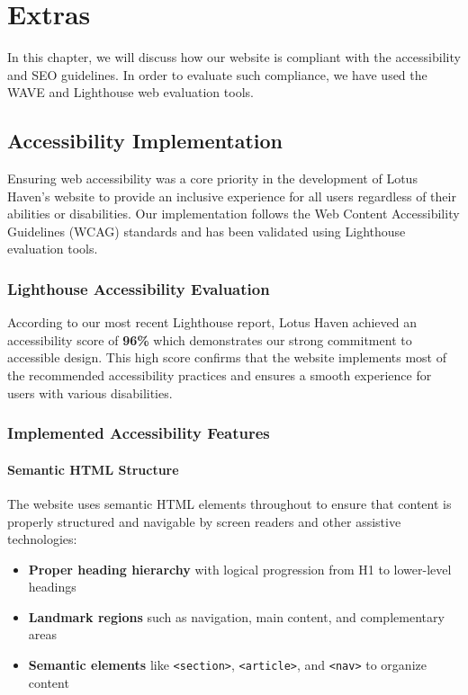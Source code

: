 \section{Extras}

In this chapter, we will discuss how our website is compliant with the accessibility and
SEO guidelines. In order to evaluate such compliance, we have used the WAVE and
Lighthouse web evaluation tools.

\subsection{Accessibility Implementation}

Ensuring web accessibility was a core priority in the development of Lotus Haven's website to provide an inclusive experience for all users regardless of their abilities or disabilities. Our implementation follows the Web Content Accessibility Guidelines (WCAG) standards and has been validated using Lighthouse evaluation tools.

\subsubsection{Lighthouse Accessibility Evaluation}

According to our most recent Lighthouse report, Lotus Haven achieved an accessibility score of \textbf{96\%} which demonstrates our strong commitment to accessible design. This high score confirms that the website implements most of the recommended accessibility practices and ensures a smooth experience for users with various disabilities.

\subsubsection{Implemented Accessibility Features}

\paragraph{Semantic HTML Structure}
The website uses semantic HTML elements throughout to ensure that content is properly structured and navigable by screen readers and other assistive technologies:

\begin{itemize}
    \item \textbf{Proper heading hierarchy} with logical progression from H1 to lower-level headings
    \item \textbf{Landmark regions} such as navigation, main content, and complementary areas
    \item \textbf{Semantic elements} like \texttt{<section>}, \texttt{<article>}, and \texttt{<nav>} to organize content
\end{itemize}

